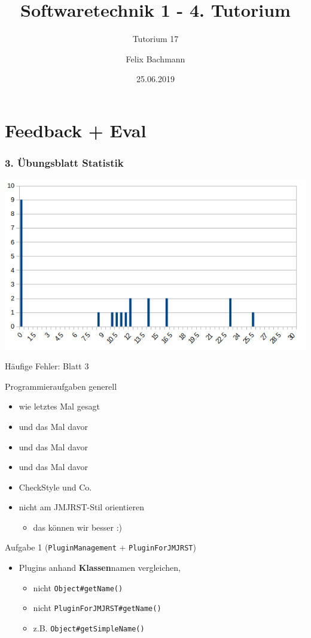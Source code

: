 \documentclass[18pt]{beamer}
\title[SWT1]{Softwaretechnik 1 - 4. Tutorium}
\subtitle{Tutorium 17}
\author{Felix Bachmann}
\date{25.06.2019}
\institute{KIT - Institut für Programmstrukturen und Datenorganisation (IPD)}
\begin{document}

\begin{frame}
\titlepage
\end{frame}

\section{Feedback + Eval}
	\begin{frame}
	\frametitle{3. Übungsblatt Statistik}
	\includegraphics[scale=0.7]{./pics/tut3/statistics-ub3.png}
\end{frame}

\begin{frame}{Häufige Fehler: Blatt 3}
\begin{block}{Programmieraufgaben generell}
	\begin{itemize}
		\item wie letztes Mal gesagt \pause
		\item und das Mal davor \pause
		\item und das Mal davor \pause
		\item und das Mal davor \pause
		\item CheckStyle und Co.
		\pause
		\item nicht am JMJRST-Stil orientieren
		\begin{itemize}
			\item das können wir besser :)
		\end{itemize}
	\end{itemize}
\end{block} 

\begin{block}{Aufgabe 1 (\texttt{PluginManagement} + \texttt{PluginForJMJRST})}
\begin{itemize}
	\pause
	\item Plugins anhand \textbf{Klassen}namen vergleichen, 
	\begin{itemize}
		\item nicht \texttt{Object\#getName()}
		\item nicht \texttt{PluginForJMJRST\#getName()}
		\item z.B. \texttt{Object\#getSimpleName()}
	\end{itemize}
\end{itemize}
\end{block}
\end{frame}
\end{document}
